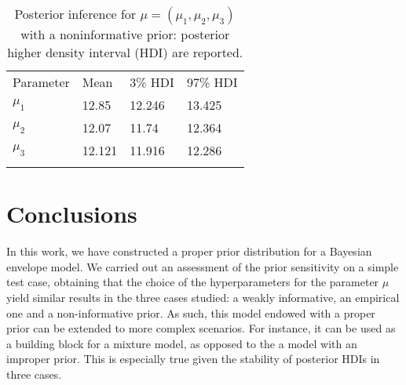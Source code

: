 \documentclass[graybox]{svmult}
\begin{document}
\begin{table}
\caption{Posterior inference for $\mu = \left( \mu_{1}, \mu_{2}, \mu_{3}\right)$ with a noninformative prior: posterior higher density interval (HDI) are reported.}
\label{tab:3}       %
%
%
\begin{tabular}{p{2cm}p{2.4cm}p{2cm}p{4.9cm}}
\hline\noalign{\smallskip}
Parameter & Mean & 3\% HDI & 97\% HDI \\
\noalign{\smallskip}\svhline\noalign{\smallskip}
$\mu_{1}$ & 12.85  & 12.246 & 13.425 \\
$\mu_2$ & 12.07 & 11.74 & 12.364\\
$\mu_3$ & 12.121  & 11.916 & 12.286 \\
\noalign{\smallskip}\hline\noalign{\smallskip}
\end{tabular}
\end{table}

\section{Conclusions}
In this work, we have constructed a proper prior distribution for a
Bayesian envelope model. We carried out an assessment of the prior
sensitivity on a simple test case, obtaining that the choice of the
hyperparameters for the parameter $\mu$ yield similar results in the
three cases studied: a weakly informative, an empirical one and a
non-informative prior. As such, this model endowed with a proper prior
can be extended to more complex scenarios. For instance, it can be
used as a building block for a mixture model, as opposed to the a
model with an improper prior. This is especially true given the
stability of posterior HDIs in three cases.


\end{document}
